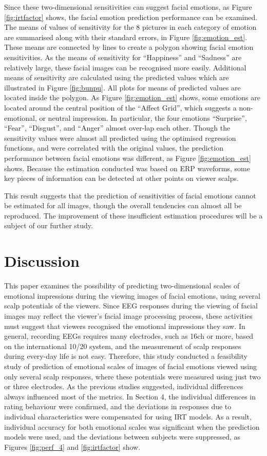 \documentclass[fonts]{icst}
\begin{document}
Since these two-dimensional sensitivities can suggest facial
emotions, as Figure \ref{fig:irtfactor} shows, the facial emotion
prediction performance can be examined. 
The means of values of sensitivity for the 8 pictures in each category
of emotion are summarised along with their standard errors, in Figure
\ref{fig:emotion_est}. These means are connected by lines to create a
polygon showing facial emotion sensitivities.  
As the means of sensitivity for ``Happiness'' and ``Sadness'' are
relatively large, these facial images can be recognised more easily.
Additional means of sensitivity are calculated using the predicted
values which are illustrated in Figure \ref{fig:bunpu}. 
All plots for means of predicted values are located inside the
polygon. 
As Figure \ref{fig:emotion_est} shows, some emotions are located
around the central position of the ``Affect Grid'', which suggests a
non-emotional, or neutral impression. 
In particular, the four emotions ``Surprise'', ``Fear'',
``Disgust'', and ``Anger'' almost over-lap each other.
Though the sensitivity values were almost all predicted using the
optimised regression functions, and were correlated with the
original values, the prediction performance between
facial emotions was different, as Figure \ref{fig:emotion_est} shows. 
Because the estimation conducted was based on ERP waveforms, some key
pieces of information can be detected at other points on viewer scalps.

This result suggests that the prediction of sensitivities of facial
emotions cannot be estimated for all images, 
though the overall tendencies can almost all be reproduced. 
The improvement of these insufficient estimation procedures will be a
subject of our further study. 


\section{Discussion}

This paper examines the possibility of predicting two-dimensional scales
of emotional impressions during the viewing images of facial emotions,
using several scalp potentials of the viewers. 
Since EEG responses during the viewing of facial images may reflect the
viewer's facial image processing process, these activities must suggest
that viewers recognised the emotional impressions they saw. 
In general, recording EEGs requires many electrodes, such as 16ch or
more, based on the international 10/20 system, and the measurement of
scalp responses during every-day life is not easy. 
Therefore, this study conducted a feasibility study of prediction of
emotional scales of images of facial emotions viewed using only several
scalp responses, where these potentials were measured using just two or
three electrodes.     
As the previous studies suggested, individual differences
always influenced most of the metrics. 
In Section 4, the individual differences in rating behaviour were
confirmed, and the deviations in responses due to individual
characteristics were compensated for using IRT models. 
As a result, individual accuracy for both emotional scales was
significant when the prediction models were used, and the deviations
between subjects were suppressed, as Figures \ref{fig:perf_4} and
\ref{fig:irtfactor} show. 
\end{document}
